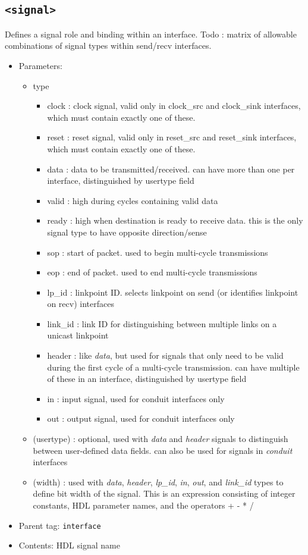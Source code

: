 \documentclass{article}
\begin{document}
\subsection{\texttt{<signal>}}

Defines a signal role and binding within an interface. Todo : matrix of allowable combinations of signal types within send/recv interfaces.

\begin{itemize}
	\item{Parameters:}
	\begin{itemize}
		\item{type}
		\begin{itemize}
			\item{clock : clock signal, valid only in clock\_src and clock\_sink interfaces, which must contain exactly one of these.}
			\item{reset : reset signal, valid only in reset\_src and reset\_sink interfaces, which must contain exactly one of these.}
			\item{data : data to be transmitted/received. can have more than one per interface, distinguished by usertype field}
			\item{valid : high during cycles containing valid data}
			\item{ready : high when destination is ready to receive data. this is the only signal type to have opposite direction/sense} 
			\item{sop : start of packet. used to begin multi-cycle transmissions}
			\item{eop : end of packet. used to end multi-cycle transmissions}
			\item{lp\_id : linkpoint ID. selects linkpoint on send (or identifies linkpoint on recv) interfaces}
			\item{link\_id : link ID for distinguishing between multiple links on a unicast linkpoint}
			\item{header : like \textit{data}, but used for signals that only need to be valid during the first cycle of a multi-cycle transmission. can have multiple of these in an interface, distinguished by usertype field}
			\item{in : input signal, used for conduit interfaces only}
			\item{out : output signal, used for conduit interfaces only}
		\end{itemize}
		\item{(usertype) : optional, used with \textit{data} and \textit{header} signals to distinguish between user-defined data fields. can also be used for signals in \textit{conduit} interfaces}
		\item{(width) : used with \textit{data}, \textit{header}, \textit{lp\_id}, \textit{in}, \textit{out}, and \textit{link\_id} types to define bit width of the signal. This is an expression consisting of integer constants, HDL parameter names, and the operators + - * /}
	\end{itemize}
	\item{Parent tag: \texttt{interface}}
	\item{Contents: HDL signal name}
\end{itemize}
\end{document}
